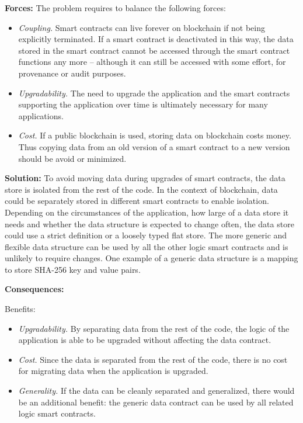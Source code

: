 \vspace{0.5em}\noindent \textbf{Forces:} The problem requires to balance the following forces:
\begin{itemize}
  \item \textit{Coupling.} Smart contracts can live forever on blockchain if not being explicitly terminated. If a smart contract is deactivated in this way, the data stored in the smart contract cannot be accessed through the smart contract functions any more -- although it can still be accessed with some effort, \eg for provenance or audit purposes.
  \item \textit{Upgradability.} The need to upgrade the application and the smart contracts supporting the application over time is ultimately necessary for many applications. 
  \item \textit{Cost.} If a public blockchain is used, storing data on blockchain costs money. Thus copying data from an old version of a smart contract to a new version should be avoid or minimized. 
\end{itemize}

\vspace{0.5em}\noindent \textbf{Solution:} 
To avoid moving data during upgrades of smart contracts, the data store is isolated from the rest of the code. %
In the context of blockchain, data could be separately stored in different smart contracts to enable isolation. Depending on the circumstances of the application, how large of a data store it needs and whether the data structure is expected to change often, the data store could use a strict definition or a loosely typed flat store. The more generic and flexible data structure can be used by all the other logic smart contracts and is unlikely to require changes. One example of a generic data structure is a mapping to store SHA-256 key and value pairs. 





\vspace{0.5em}\noindent \textbf{Consequences:} 

Benefits:
\begin{itemize}
  \item \textit{Upgradability.} By separating data from the rest of the code, the logic of the application is able to be upgraded without affecting the data contract.
  \item \textit{Cost.} Since the data is separated from the rest of the code, there is no cost for migrating data when the application is upgraded.
  \item \textit{Generality.} If the data can be cleanly separated and generalized, there would be an additional benefit: the generic data contract can be used by all related logic smart contracts. 
\end{itemize}

